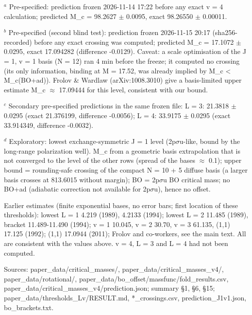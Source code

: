 \begin{table}[t]
\par\footnotesize $^a$ Pre-specified: prediction frozen 2026-11-14 17:22 before any exact v = 4 calculation; predicted M\_c = 98.2627 $\pm$ 0.0095, exact 98.26550 $\pm$ 0.00011.
\par\footnotesize $^b$ Pre-specified (second blind test): prediction frozen 2026-11-15 20:17 (sha256-recorded) before any exact crossing was computed; predicted M\_c = 17.1072 $\pm$ 0.0295, exact 17.094282 (difference -0.0129). Caveat: a scale optimisation of the J = 1, v = 1 basis (N = 12) ran 4 min before the freeze; it computed no crossing (its only information, binding at M = 17.52, was already implied by M\_c < M\_c(BO+ad)). Frolov \& Wardlaw (arXiv:1008.3010) give a basis-limited upper estimate M\_c $\approx$ 17.09444 for this level, consistent with our bound.
\par\footnotesize $^c$ Secondary pre-specified predictions in the same frozen file: L = 3: 21.3818 $\pm$ 0.0295 (exact 21.376199, difference -0.0056); L = 4: 33.9175 $\pm$ 0.0295 (exact 33.914349, difference -0.0032).
\par\footnotesize $^d$ Exploratory: lowest exchange-symmetric J = 1 level (2p$\sigma$u-like, bound by the long-range polarization well). M\_c from a geometric basis extrapolation that is not converged to the level of the other rows (spread of the bases $\approx$ 0.1); upper bound = rounding-safe crossing of the compact N = 10 + 5 diffuse basis (a larger basis crosses at 813.6015 without margin); BO = 2p$\sigma$u BO critical mass; no BO+ad (adiabatic correction not available for 2p$\sigma$u), hence no offset.
\par\footnotesize Earlier estimates (finite exponential bases, no error bars; first location of these thresholds): lowest L = 1 4.219 (1989), 4.2133 (1994); lowest L = 2 11.485 (1989), bracket 11.489-11.490 (1994); v = 1 10.045, v = 2 30.70, v = 3 61.135, (1,1) 17.125 (1992); (1,1) 17.0944 (2011); Frolov and co-workers, see the main text. All are consistent with the values above. v = 4, L = 3 and L = 4 had not been computed.
\par\footnotesize Sources: paper\_data/critical\_masses/, paper\_data/critical\_masses\_v4/, paper\_data/rotational/, paper\_data/bo\_offset/massfunc/fold\_results.csv, paper\_data/critical\_masses\_v4/prediction.json; summary \S1, \S6, \S15; paper\_data/thresholds\_Lv/RESULT.md, *\_crossings.csv, prediction\_J1v1.json, bo\_brackets.txt.
\end{table}

